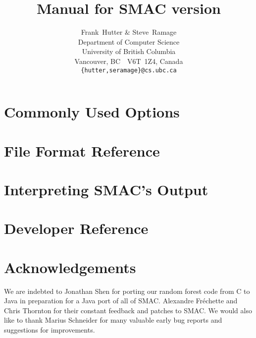 \documentclass[11pt,letterpaper,oneside]{article}
\begin{document}
\title{Manual for SMAC version }

\author{
Frank~Hutter \& Steve~Ramage\\
Department of Computer Science\\
University of British Columbia\\
Vancouver, BC\ \ V6T~1Z4, Canada\\
\texttt{\{hutter,seramage\}@cs.ubc.ca}
}


\maketitle

\tableofcontents



  
\section{Commonly Used Options}



\section{File Format Reference} 


\section{Interpreting SMAC's Output}



 
\section{Developer Reference}



\section{Acknowledgements}

We are indebted to Jonathan Shen for porting our random forest code from C to Java in preparation for a Java port of all of SMAC. Alexandre Fr\'echette and Chris Thornton for their constant feedback and patches to SMAC.  We would also like to thank Marius Schneider for many valuable early bug reports and suggestions for improvements. 
\end{document}
